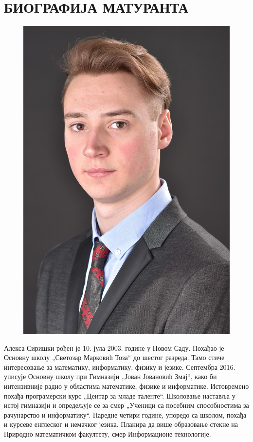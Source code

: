 \documentclass[a4paper,14pt]{article}
\begin{document}
\section*{БИОГРАФИЈА МАТУРАНТА}
\begin{figure}
\centering
\includegraphics[width=.90\linewidth]{Maturska}
\end{figure}
Алекса Сиришки рођен је 10. јула 2003. године у Новом Саду. Похађао је Основну школу „Светозар Марковић Тоза“ до шестог разреда. Тамо стиче интересовање за математику, информатику, физику и језике. Септембра 2016. уписује Основну школу при Гимназији „Јован Јовановић Змај“, како би интензивније радио у областима математике, физике и информатике. Истовремено похађа програмерски курс „Центар за младе таленте“. Школовање наставља у истој гимназији и опредељује се за смер „Ученици са посебним способностима за рачунарство и информатику“. Наредне четири године, упоредо са школом, похађа и курсеве енглеског и немачког језика. Планира да више образовање стекне на Природно математичком факултету, смер Информационе технологије.
\newpage
\end{document}
